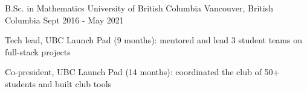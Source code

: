 
\begin{cventries}

  \cventry
    {B.Sc. in Mathematics} %
    {University of British Columbia} %
    {Vancouver, British Columbia} %
    {Sept 2016 - May 2021} %
    {
      \begin{cvitems} %
        \item {Tech lead, UBC Launch Pad (9 months): mentored and lead 3 student teams on full-stack projects}
        \item {Co-president, UBC Launch Pad (14 months): coordinated the club of 50+ students and built club tools}
      \end{cvitems}
  }
\end{cventries}
